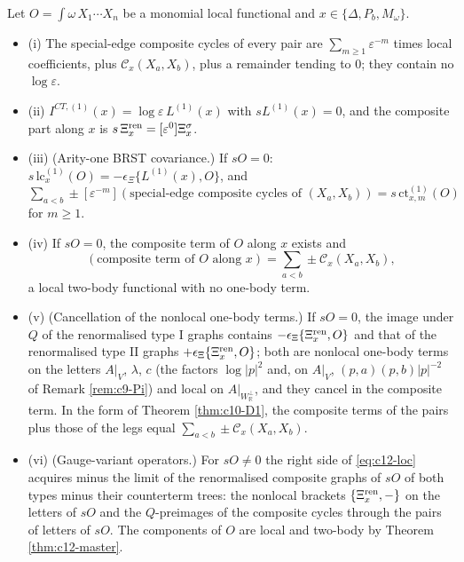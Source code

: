 \begin{theorem}
\label{thm:c12-local}
Let $O=\int\omega\,X_1\cdots X_n$ be a monomial local functional and $x\in\{\Delta,P_b,M_\omega\}$.
\begin{itemize}
\item (i) The special-edge composite cycles of every pair are $\sum_{m\ge1}\varepsilon^{-m}$ times local coefficients, plus $\mathcal C_x(X_a,X_b)$, plus a remainder tending to $0$; they contain no $\log\varepsilon$.
\item (ii) $I^{CT,(1)}(x)=\log\varepsilon\,L^{(1)}(x)$ with $sL^{(1)}(x)=0$, and the composite part along $x$ is $s\,\Xi^{\rm ren}_x=[\varepsilon^0]\Xi^\sigma_x$.
\item (iii) (Arity-one BRST covariance.) If $sO=0$: $s\,\mathrm{lc}^{(1)}_x(O)=-\epsilon_\Xi\{L^{(1)}(x),O\}$, and $\sum_{a<b}\pm[\varepsilon^{-m}](\text{special-edge composite cycles of }(X_a,X_b))=s\,\mathrm{ct}^{(1)}_{x,m}(O)$ for $m\ge1$.
\item (iv) If $sO=0$, the composite term of $O$ along $x$ exists and
\begin{equation}
(\text{composite term of }O\text{ along }x)=\sum_{a<b}\pm\mathcal C_x(X_a,X_b),
\label{eq:c12-loc}
\end{equation}
a local two-body functional with no one-body term.
\item (v) (Cancellation of the nonlocal one-body terms.) If $sO=0$, the image under $Q$ of the renormalised type I graphs contains $-\epsilon_\Xi\{\Xi^{\rm ren}_x,O\}$ and that of the renormalised type II graphs $+\epsilon_\Xi\{\Xi^{\rm ren}_x,O\}$; both are nonlocal one-body terms on the letters $A|_V$, $\lambda$, $c$ (the factors $\log|p|^2$ and, on $A|_V$, $(p,a)(p,b)|p|^{-2}$ of Remark \ref{rem:c9-Pi}) and local on $A|_{W_{\mathbb R}^\perp}$, and they cancel in the composite term. In the form of Theorem \ref{thm:c10-D1}, the composite terms of the pairs plus those of the legs equal $\sum_{a<b}\pm\mathcal C_x(X_a,X_b)$.
\item (vi) (Gauge-variant operators.) For $sO\neq0$ the right side of \eqref{eq:c12-loc} acquires minus the limit of the renormalised composite graphs of $sO$ of both types minus their counterterm trees: the nonlocal brackets $\{\Xi^{\rm ren}_x,-\}$ on the letters of $sO$ and the $Q$-preimages of the composite cycles through the pairs of letters of $sO$. The components of $O$ are local and two-body by Theorem \ref{thm:c12-master}.
\end{itemize}
\end{theorem}

